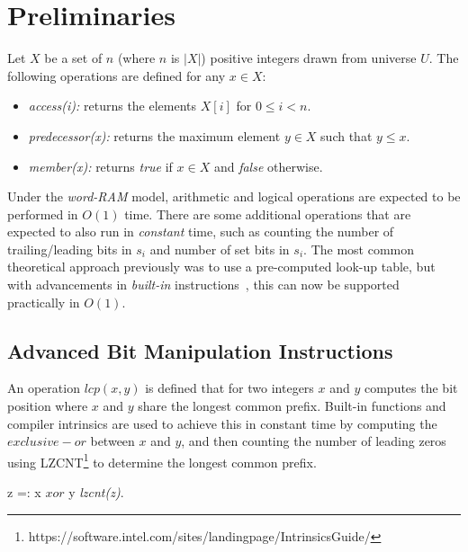 \section{Preliminaries} \label{sec:preliminaries}
Let $X$ be a set of $n$ (where $n$ is $|X|$) positive integers drawn from universe $U$. The following operations are defined for any $x \in X$:
\begin{itemize}
    \item \textit{access(i):} returns the elements $X[i]$ for $0 \leq i < n$.
    \item \textit{predecessor(x):} returns the maximum element $y \in X$ such that $y \leq x$.
    \item \textit{member(x):} returns \textit{true} if $x \in X$ and \textit{false} otherwise.
\end{itemize}
Under the \textit{word-RAM} model, arithmetic and logical operations are expected to be performed in $O(1)$ time. There are some additional operations that are expected to also run in \textit{constant} time, such as counting the number of trailing/leading bits in $s_i$ and number of set bits in $s_i$. The most common theoretical approach previously was to use a pre-computed look-up table, but with advancements in \textit{built-in} instructions~\cite{AMD64_2020, ARM_A64_2018, Intel_IA32_2016}, this can now be supported practically in $O(1)$.
\par
\subsection{Advanced Bit Manipulation Instructions}
%
An operation $lcp(x, y)$ is defined that for two integers $x$ and $y$ computes the bit position where $x$ and $y$ share the longest common prefix. Built-in functions and compiler intrinsics are used to achieve this in constant time by computing the $exclusive-or$ between $x$ and $y$, and then counting the number of leading zeros using LZCNT\footnote{https://software.intel.com/sites/landingpage/IntrinsicsGuide/} to determine the longest common prefix.
\begin{table}[ht]
    \centering
    \begin{minipage}[t]{1\textwidth}
        \centering
        \begin{algorithm}[H]
            \caption{LCP(c, y)}
            \begin{algorithmic}[1]
                \STATE z =: x $xor$ y
                \RETURN \textit{lzcnt(z)}.
            \end{algorithmic}
        \end{algorithm}
    \end{minipage}%
\end{table}

